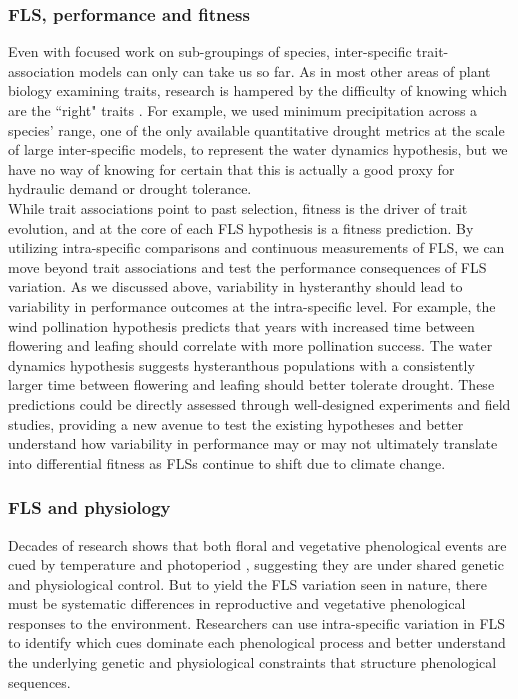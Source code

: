 \documentclass{article}
\begin{document}
\subsubsection*{FLS, performance and fitness}
Even with focused work on sub-groupings of species, inter-specific trait-association models can only can take us so far. As in most other areas of plant biology examining traits, research is hampered by the difficulty of knowing which are the ``right" traits \citep{Violle2007}. For example, we used minimum precipitation across a species' range, one of the only available quantitative drought metrics at the scale of large inter-specific models, to represent the water dynamics hypothesis, but we have no way of knowing for certain that this is actually a good proxy for hydraulic demand or drought tolerance. \\

\noindent While trait associations point to past selection, fitness is the driver of trait evolution, and at the core of each FLS hypothesis is a fitness prediction. By utilizing intra-specific comparisons and continuous measurements of FLS, we can move beyond trait associations and test the performance consequences of FLS variation. As we discussed above, variability in hysteranthy should lead to variability in performance outcomes at the intra-specific level. For example, the wind pollination hypothesis predicts that years with increased time between flowering and leafing should correlate with more pollination success. The water dynamics hypothesis suggests hysteranthous populations with a consistently larger time between flowering and leafing should better tolerate drought. These predictions could be directly assessed through well-designed experiments and field studies, providing a new avenue to test the existing hypotheses and better understand how variability in performance may or may not ultimately translate into differential fitness as FLSs continue to shift due to climate change.\\

\subsubsection*{FLS and physiology} 
\noindent Decades of research shows that both floral and vegetative phenological events are cued by temperature and photoperiod \citep{Forrest2010, Flynn2018}, suggesting they are under shared genetic and physiological control. But to yield the FLS variation seen in nature, there must be systematic differences in reproductive and vegetative phenological responses to the environment. Researchers can use intra-specific variation in FLS to identify which cues dominate each phenological process and better understand the underlying genetic and physiological constraints that structure phenological sequences.\\
\end{document}

